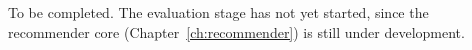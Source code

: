 \label{sec:eval-results}

To be completed. The evaluation stage has not yet started, since the recommender core
(Chapter~\ref{ch:recommender}) is still under development.
